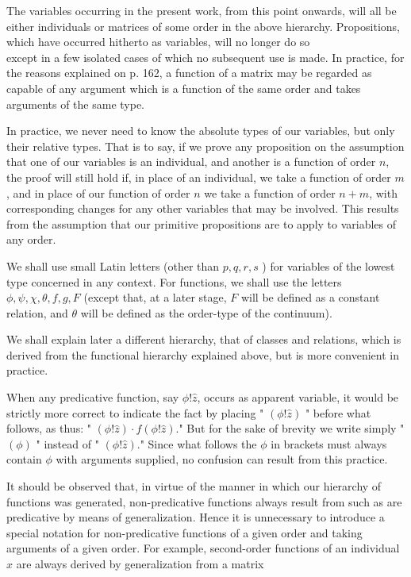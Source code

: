 \documentclass[10pt]{article}
\begin{document}
The variables occurring in the present work, from this point onwards, will all be either individuals or matrices of some order in the above hierarchy. Propositions, which have occurred hitherto as variables, will no longer do so\\
except in a few isolated cases of which no subsequent use is made. In practice, for the reasons explained on p. 162, a function of a matrix may be regarded as capable of any argument which is a function of the same order and takes arguments of the same type.

In practice, we never need to know the absolute types of our variables, but only their relative types. That is to say, if we prove any proposition on the assumption that one of our variables is an individual, and another is a function of order $n$, the proof will still hold if, in place of an individual, we take a function of order $m$, and in place of our function of order $n$ we take a function of order $n+m$, with corresponding changes for any other variables that may be involved. This results from the assumption that our primitive propositions are to apply to variables of any order.

We shall use small Latin letters (other than $p, q, r, s$ ) for variables of the lowest type concerned in any context. For functions, we shall use the letters $\phi, \psi, \chi, \theta, f, g, F$ (except that, at a later stage, $F$ will be defined as a constant relation, and $\theta$ will be defined as the order-type of the continuum).

We shall explain later a different hierarchy, that of classes and relations, which is derived from the functional hierarchy explained above, but is more convenient in practice.

When any predicative function, say $\phi!\hat{z}$, occurs as apparent variable, it would be strictly more correct to indicate the fact by placing " $(\phi!\hat{z})$ " before what follows, as thus: " $(\phi!\hat{z}) \cdot f(\phi!\hat{z})$." But for the sake of brevity we write simply " $(\phi)$ " instead of " $(\phi!\hat{z})$." Since what follows the $\phi$ in brackets must always contain $\phi$ with arguments supplied, no confusion can result from this practice.

It should be observed that, in virtue of the manner in which our hierarchy of functions was generated, non-predicative functions always result from such as are predicative by means of generalization. Hence it is unnecessary to introduce a special notation for non-predicative functions of a given order and taking arguments of a given order. For example, second-order functions of an individual $x$ are always derived by generalization from a matrix
\end{document}
